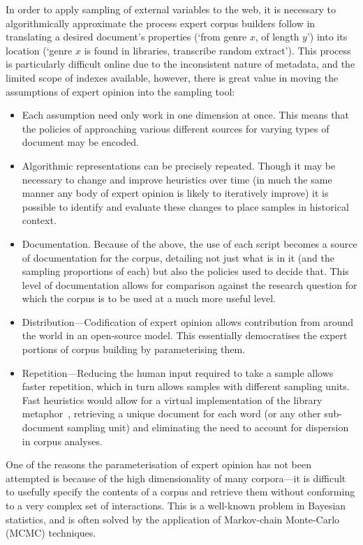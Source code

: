 In order to apply sampling of external variables to the web, it is necessary to algorithmically approximate the process expert corpus builders follow in translating a desired document's properties (`from genre $x$, of length $y$') into its location (`genre $x$ is found in libraries, transcribe random extract').  This process is particularly difficult online due to the inconsistent nature of metadata, and the limited scope of indexes available, however, there is great value in moving the assumptions of expert opinion into the sampling tool:

\begin{itemize}
    \item Each assumption need only work in one dimension at once.  This means that the policies of approaching various different sources for varying types of document may be encoded.
    \item Algorithmic representations can be precisely repeated.  Though it may be necessary to change and improve heuristics over time (in much the same manner any body of expert opinion is likely to iteratively improve) it is possible to identify and evaluate these changes to place samples in historical context.
    \item Documentation.  Because of the above, the use of each script becomes a source of documentation for the corpus, detailing not just what is in it (and the sampling proportions of each) but also the policies used to decide that.  This level of documentation allows for comparison against the research question for which the corpus is to be used at a much more useful level.
    \item Distribution---Codification of expert opinion allows contribution from around the world in an open-source model.  This essentially democratises the expert portions of corpus building by parameterising them.
    \item Repetition---Reducing the human input required to take a sample allows faster repetition, which in turn allows samples with different sampling units.  Fast heuristics would allow for a virtual implementation of the library metaphor~\cite{evert2006random}, retrieving a unique document for each word (or any other sub-document sampling unit) and eliminating the need to account for dispersion in corpus analyses.
\end{itemize}


One of the reasons the parameterisation of expert opinion has not been attempted is because of the high dimensionality of many corpora---it is difficult to usefully specify the contents of a corpus and retrieve them without conforming to a very complex set of interactions.  This is a well-known problem in Bayesian statistics, and is often solved by the application of Markov-chain Monte-Carlo (MCMC) techniques.

